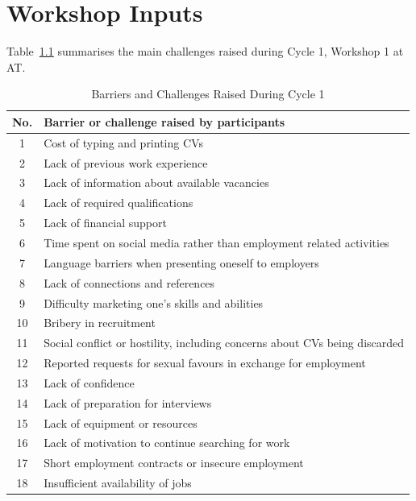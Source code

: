 \chapter{Workshop Inputs}
\label{app:workshop-inputs}


Table~\ref{tab:cycle1_barriers} summarises the main challenges raised during Cycle 1, Workshop 1 at AT.

\begin{table}[htbp]
\centering
\caption{Barriers and Challenges Raised During Cycle 1}
\label{tab:cycle1_barriers}
\small
\renewcommand{\arraystretch}{1.12}
\begin{tabular}{c p{12.5cm}}
\hline
\textbf{No.} & \textbf{Barrier or challenge raised by participants} \\
\hline
1 & Cost of typing and printing CVs \\
2 & Lack of previous work experience \\
3 & Lack of information about available vacancies \\
4 & Lack of required qualifications \\
5 & Lack of financial support \\
6 & Time spent on social media rather than employment related activities \\
7 & Language barriers when presenting oneself to employers \\
8 & Lack of connections and references \\
9 & Difficulty marketing one's skills and abilities \\
10 & Bribery in recruitment \\
11 & Social conflict or hostility, including concerns about CVs being discarded \\
12 & Reported requests for sexual favours in exchange for employment \\
13 & Lack of confidence \\
14 & Lack of preparation for interviews \\
15 & Lack of equipment or resources \\
16 & Lack of motivation to continue searching for work \\
17 & Short employment contracts or insecure employment \\
18 & Insufficient availability of jobs \\
\hline
\end{tabular}
\end{table}

